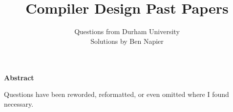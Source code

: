 \documentclass[a4paper, answers]{exam}
\title{Compiler Design Past Papers}
\author{
    Questions from Durham University \\ 
    Solutions by Ben Napier
}
\begin{document}
    \begin{titlepage}
        \maketitle
    \end{titlepage}

    \tableofcontents
    \clearpage

    \thispagestyle{empty}
    \vspace*{21.5em}
    \begin{center}
        \parbox{0.77\textwidth}{
            \noindent
            \begin{center}
                \normalsize\textbf{Abstract}
            \end{center}
            \vspace{-3pt}
            Questions have been reworded, reformatted, 
            or even omitted where I found necessary.
        }
    \end{center}
    \vspace*{\fill}

    \clearpage
    \begin{questions}
        
        
    \end{questions}
\end{document}
